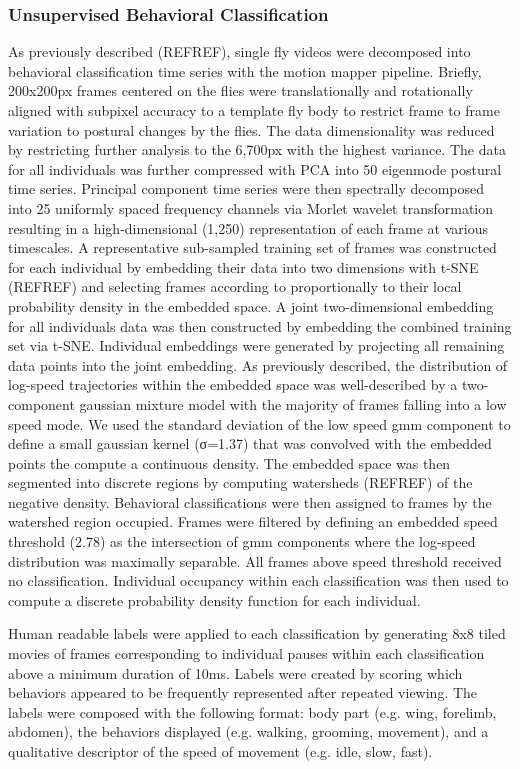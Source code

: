 \documentclass[12pt,letterpaper]{article}
\begin{document}
\subsubsection{Unsupervised Behavioral Classification}

As previously described (REFREF), single fly videos were decomposed into behavioral classification time series with the motion mapper pipeline. Briefly, 200x200px frames centered on the flies were translationally and rotationally aligned with subpixel accuracy to a template fly body to restrict frame to frame variation to postural changes by the flies. The data dimensionality was reduced by restricting further analysis to the 6,700px with the highest variance. The data for all individuals was further compressed with PCA into 50 eigenmode postural time series. Principal component time series were then spectrally decomposed into 25 uniformly spaced frequency channels via Morlet wavelet transformation resulting in a high-dimensional (1,250) representation of each frame at various timescales. A representative sub-sampled training set of frames was constructed for each individual by embedding their data into two dimensions with t-SNE (REFREF) and selecting frames according to proportionally to their local probability density in the embedded space. A joint two-dimensional embedding for all individuals data was then constructed by embedding the combined training set via t-SNE. Individual embeddings were generated by projecting all remaining data points into the joint embedding. As previously described, the distribution of log-speed trajectories within the embedded space was well-described by a two-component gaussian mixture model with the majority of frames falling into a low speed mode. We used the standard deviation of the low speed gmm component to define a small gaussian kernel (σ=1.37) that was convolved with the embedded points the compute a continuous density. The embedded space was then segmented into discrete regions by computing watersheds (REFREF) of the negative density. Behavioral classifications were then assigned to frames by the watershed region occupied. Frames were filtered by defining an embedded speed threshold (2.78) as the intersection of gmm components where the log-speed distribution was maximally separable. All frames above speed threshold received no classification. Individual occupancy within each classification was then used to compute a discrete probability density function for each individual.

Human readable labels were applied to each classification by generating 8x8 tiled movies of frames corresponding to individual pauses within each classification above a minimum duration of 10ms. Labels were created by scoring which behaviors appeared to be frequently represented after repeated viewing. The labels were composed with the following format: body part (e.g. wing, forelimb, abdomen), the behaviors displayed (e.g. walking, grooming, movement), and a qualitative descriptor of the speed of movement (e.g. idle, slow, fast). 
\end{document}
